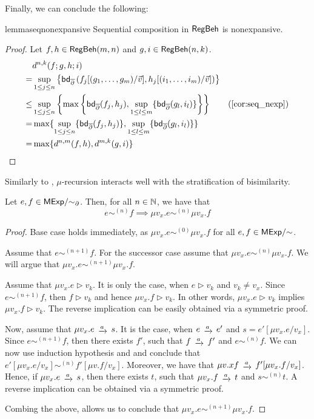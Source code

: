 Finally, we can conclude the following:
\begin{restatable}{lemma}{seqnonexpansive}\label{lem:seq_nonexpansive}
	Sequential composition in $\mathsf{RegBeh}$ is nonexpansive.
\end{restatable}
\begin{proof}
	Let $f,h \in \mathsf{RegBeh}(m,n)$ and $g,i \in \mathsf{RegBeh}(n,k)$. 
	\begin{align*}
		&d^{n,k}(f ;g, h;i)\\
		=& \sup_{1 \leq j \leq n} \left\{ \mathsf{bd}_{\overline\partial} \left(  f_j[(g_1, \dots, g_m)/\vec{v}], h_j[(i_1, \dots, i_m)/\vec{v}] \right)\right\}\\
		\leq & \sup_{1 \leq j \leq n} \left\{\max \left\{\mathsf{bd}_{\overline\partial} (f_j,h_j), \sup_{ 1 \leq l \leq m} \{\mathsf{bd}_{\overline\partial} (g_l, i_l)\}\right\}\right\} \tag{\Cref{cor:seq_nexp}} \\
		= & \max \{ \sup_{1 \leq j \leq n} \{\mathsf{bd}_{\overline\partial} (f_j,h_j)\}, \sup_{ 1 \leq l \leq m} \{\mathsf{bd}_{\overline\partial} (g_l, i_l)\}\}\\
		= & \max \{d^{n,m}(f,h), d^{m,k}(g,i)\} \tag*{\hfill\qedhere}
	\end{align*}
\end{proof}
Similarly to , $\mu$-recursion interacts well with the stratification of bisimilarity.
\begin{lemma}\label{lem:rec_startified_bisim}
	Let $e, f \in {\mathsf{MExp}}/{\sim_{\partial}}$. Then, for all $n \in \mathbb{N}$, we have that
	$$
	e \sim^{(n)} f \implies \mu v_x. e \sim^{(n)} \mu v_x.f
	$$
\end{lemma}
\begin{proof}
	Base case holds immediately, as $\mu v_x.e \sim^{(0)} \mu v_x.f$ for all $e, f \in {\mathsf{MExp}}/{\sim}$. 
	
	Assume that $e \sim^{(n+1)} f$. For the successor case assume that $\mu v_x . e \sim^{(n)} \mu v_x. f$. We will argue that $\mu v_x . e \sim^{(n+1)} \mu v_x. f$.
	
	Assume that $\mu v_x.e \rhd v_k$. It is only the case, when $e \rhd {v_k}$ and $v_k \neq v_x$. Since $e \sim^{(n+1)} f$, then $f \rhd {v_k}$ and hence $\mu v_x . f \rhd v_k$. In other words, $\mu v_x.e \rhd v_k$ implies $\mu v_x. f \rhd v_k$. The reverse implication can be easily obtained via a symmetric proof.
	
	Now, assume that $\mu v_x.e \tr{a} s$. It is the case, when $e \tr{a} e'$ and $s = e'[\mu v_x.e / v_x]$. Since $e \sim^{(n+1)} f$, then there exists $f'$, such that $f \tr{a} f'$ and $e \sim^{(n)} f$. We can now use induction hypothesis and  and conclude that $e'[\mu v_x. e / v_x] \sim^{(n)} f' [\mu v. f / v_x]$. Moreover, we have that $\mu v.x f \tr{a} f'[\mu v_x.f/v_x]$. Hence, if $\mu v_x.e \tr{a} s$, then there exists $t$, such that $\mu v_x.f \tr{a} t$ and $s \sim^{(n)} t$. A reverse implication can be obtained via a symmetric proof. 
	
	Combing the above, allows us to conclude that $\mu v_x. e \sim^{(n+1)} \mu v_x . f$.
\end{proof}

